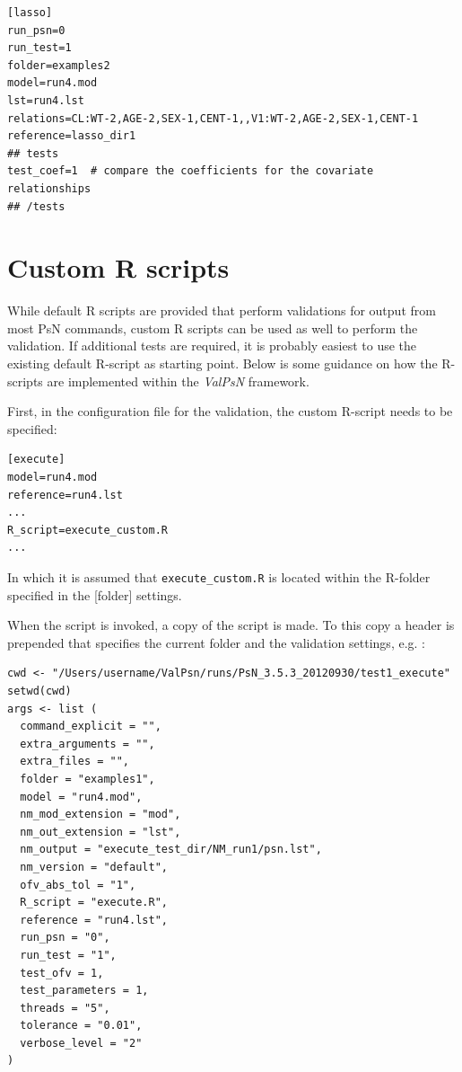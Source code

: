 \documentclass[a4,11pt]{report} \usepackage[pdftex]{graphicx}
\newcommand{\ValPsN}{\textcolor{PiranaOrange}{\textit{ValPsN}}\xspace}
\begin{document}
\vspace{10pt}

\begin{lstlisting}
[lasso]
run_psn=0
run_test=1
folder=examples2
model=run4.mod
lst=run4.lst
relations=CL:WT-2,AGE-2,SEX-1,CENT-1,,V1:WT-2,AGE-2,SEX-1,CENT-1
reference=lasso_dir1
## tests
test_coef=1  # compare the coefficients for the covariate relationships
## /tests
\end{lstlisting}

\newpage

\section{Custom R scripts}
While default R scripts are provided that perform validations for
output from most PsN commands, custom R scripts can be used as well to
perform the validation. If additional tests are required, it is
probably easiest to use the existing default R-script as starting
point. Below is some guidance on how the R-scripts are implemented
within the \ValPsN framework.

\vspace{10pt}

\noindent First, in the configuration file for the validation, the custom R-script needs to
be specified:

\begin{lstlisting}
[execute]
model=run4.mod
reference=run4.lst
...
R_script=execute_custom.R
...
\end{lstlisting}

\noindent In which it is assumed that {\tt execute\_custom.R} is located within
the R-folder specified in the {[folder]} settings.

\vspace{10pt}

\noindent When the script is invoked, a copy of the script is made. To
this copy a header is prepended that specifies the current folder
and the validation settings, e.g. :

\begin{lstlisting}
cwd <- "/Users/username/ValPsn/runs/PsN_3.5.3_20120930/test1_execute"
setwd(cwd)
args <- list (
  command_explicit = "",
  extra_arguments = "",
  extra_files = "",
  folder = "examples1",
  model = "run4.mod",
  nm_mod_extension = "mod",
  nm_out_extension = "lst",
  nm_output = "execute_test_dir/NM_run1/psn.lst",
  nm_version = "default",
  ofv_abs_tol = "1",
  R_script = "execute.R",
  reference = "run4.lst",
  run_psn = "0",
  run_test = "1",
  test_ofv = 1,
  test_parameters = 1,
  threads = "5",
  tolerance = "0.01",
  verbose_level = "2"
)
\end{lstlisting}
\end{document}

